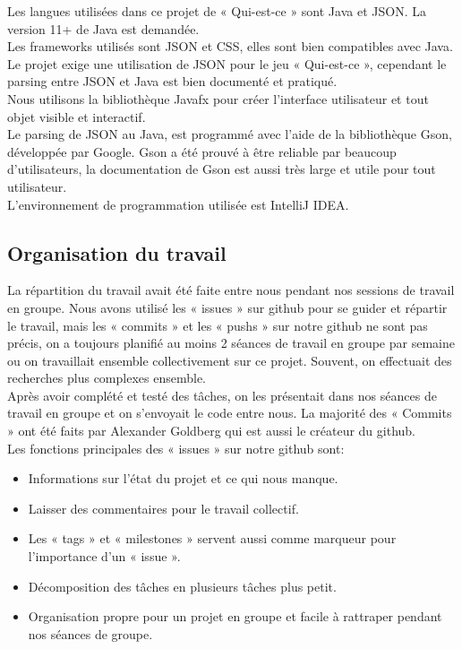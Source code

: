 \documentclass[a4paper]{article}
\begin{document}
Les langues utilisées dans ce projet de « Qui-est-ce » sont Java et JSON. La version 11+ de Java est demandée.\\
Les frameworks utilisés sont JSON et CSS, elles sont bien compatibles avec Java.
Le projet exige une utilisation de JSON pour le jeu « Qui-est-ce », cependant le parsing entre JSON et Java est bien documenté et pratiqué.\\
Nous utilisons la bibliothèque Javafx pour créer l’interface utilisateur et tout objet visible et interactif.\\
Le parsing de JSON au Java, est programmé avec l’aide de la bibliothèque Gson, développée par Google. Gson a été prouvé à être reliable par beaucoup d’utilisateurs, la documentation de Gson est aussi très large et utile pour tout utilisateur.\\
L’environnement de programmation utilisée est IntelliJ IDEA.



\subsection{Organisation du travail}

La répartition du travail avait été faite entre nous pendant nos sessions de travail en groupe. Nous avons utilisé les « issues » sur github pour se guider et répartir le travail, mais les « commits » et les « pushs » sur notre github ne sont pas précis, on a toujours planifié au moins 2 séances de travail en groupe par semaine ou on travaillait ensemble collectivement sur ce projet. Souvent, on effectuait des recherches plus complexes ensemble.\\

Après avoir complété et testé des tâches, on les présentait dans nos séances de travail en groupe et on s’envoyait le code entre nous. La majorité des « Commits » ont été faits par Alexander Goldberg qui est aussi le créateur du github.\\


Les fonctions principales des « issues » sur notre github sont:
\begin{itemize}
\item Informations sur l’état du projet et ce qui nous manque.
\item Laisser des commentaires pour le travail collectif.
\item Les « tags » et « milestones » servent aussi comme marqueur pour l’importance d’un « issue ».
\item Décomposition des tâches en plusieurs tâches plus petit.
\item Organisation propre pour un projet en groupe et facile à rattraper pendant nos séances de groupe.\\
\end{itemize}
\end{document}
